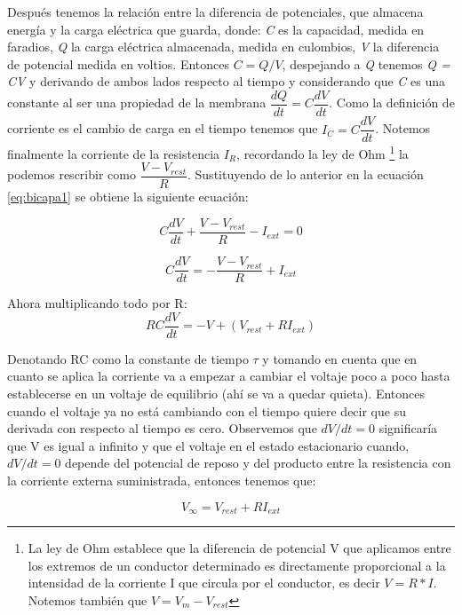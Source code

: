 Después tenemos la relación entre la diferencia de potenciales, que almacena energía y la carga eléctrica que guarda, donde: \emph{C} es la capacidad, medida en faradios, \emph{Q} la carga eléctrica almacenada, medida en culombios, \emph{V} la diferencia de potencial medida en voltios. Entonces \(C = Q/V\), despejando a \emph{Q} tenemos \emph{Q = CV} y derivando de ambos lados respecto al tiempo y considerando que \emph{C} es una constante al ser una propiedad de la membrana \(\dfrac{dQ}{dt} = C\dfrac{dV}{dt}\). Como la definición de corriente es el cambio de carga en el tiempo tenemos que \(I_{C} = C\dfrac{dV}{dt}\). Notemos finalmente la corriente de la resistencia \(I_{R}\), recordando la ley de Ohm \footnote{La ley de Ohm establece que la diferencia de potencial V que aplicamos entre los extremos de un conductor determinado es directamente proporcional a la intensidad de la corriente I que circula por el conductor, es decir \(V = R * I\). Notemos también que \(V = V_{m} - V_{rest}\) } la podemos rescribir como \(\dfrac{V-V_{rest}}{R}\). Sustituyendo de lo anterior en la ecuación \ref{eq:bicapa1} se obtiene la siguiente ecuación:

\begin{equation}
 C\dfrac{dV}{dt} + \dfrac{V-V_{rest}}{R} - I_{ext} = 0
 \label{eq:bicapa3}
\end{equation}

\begin{equation*}
 C\dfrac{dV}{dt} = -\dfrac{V-V_{rest}}{R} + I_{ext} 
\end{equation*}

Ahora multiplicando todo por R:
\begin{equation}
 RC\dfrac{dV}{dt} = -V + (V_{rest} + RI_{ext}) 
 \label{eq:bicapa4}
\end{equation}

Denotando RC como la constante de tiempo \(\tau\) y tomando en cuenta que en cuanto se aplica la corriente va a empezar a cambiar el voltaje poco a poco hasta establecerse en un voltaje de equilibrio (ahí se va a quedar quieta). Entonces cuando el voltaje ya no está cambiando con el tiempo quiere decir que su derivada con respecto al tiempo es cero. Observemos que \(dV/dt = 0\) significaría que V es igual a infinito y que el voltaje en el estado estacionario cuando, \(dV/dt = 0\) depende del potencial de reposo y del producto entre la resistencia con la corriente externa suministrada, entonces tenemos que:

\begin{equation}
 V_{\infty} = V_{rest} + RI_{ext}
 \label{eq:bicapa5}
\end{equation}

